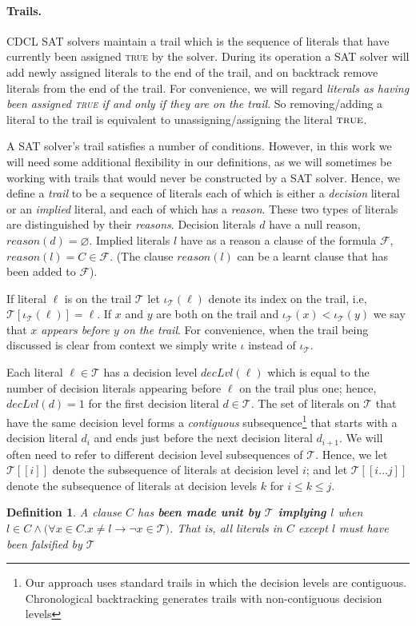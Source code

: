 \documentclass[runningheads]{llncs}
\newcommand{\sat}{SAT\xspace}
\newcommand{\trail}{\ensuremath{\mathcal{T}}}
\newcommand{\trailIdxT}[2]{\ensuremath{\iota_{#1}(#2)}}
\newcommand{\range}[2]{#1\ldots#2}
\newcommand{\dlevel}[1]{\ensuremath{\mathit{decLvl}(#1)}}
\newcommand{\true}{\textsc{true}\xspace}
\newcommand{\reason}[1]{\ensuremath{\mathit{reason}(#1)}}
\newcommand{\formula}{\ensuremath{\mathcal{F}}}
\renewcommand{\implies}{\rightarrow}
\newtheorem{defn}{Definition}
\begin{document}
\paragraph{Trails.}
CDCL \sat solvers maintain a trail which is the sequence of literals
that have currently been assigned \true by the solver. During its
operation a \sat solver will add newly assigned literals to the end of
the trail, and on backtrack remove literals from the end of the
trail. For convenience, we will regard \emph{literals as having been
  assigned \true if and only if they are on the trail}. So
removing/adding a literal to the trail is equivalent to
unassigning/assigning the literal $\true$.

A \sat solver's trail satisfies a number of conditions. However, in
this work we will need some additional flexibility in our definitions,
as we will sometimes be working with trails that would never be
constructed by a \sat solver. Hence, we define a \emph{trail} to be a
sequence of literals each of which is either a \emph{decision} literal
or an \emph{implied} literal, and each of which has a
\emph{reason}. These two types of literals are distinguished by their
\emph{reasons}. Decision literals $d$ have a null reason,
$\reason{d} = \varnothing$. Implied literals $l$ have as a reason a
clause of the formula $\formula$, $\reason{l} =
C\in\formula$. (The clause $\reason{l}$ can be a learnt clause that has been
added to $\formula$).

If literal $\ell$ is on the trail $\trail$ let
$\trailIdxT{\trail}{\ell}$ denote its index on the trail, i.e,
$\trail[\trailIdxT{\trail}{\ell}] = \ell$. If $x$ and $y$ are both on
the trail and $\trailIdxT{\trail}{x} < \trailIdxT{\trail}{y}$ we say
that \textit{$x$ appears before $y$ on the trail}. For convenience,
when the trail being discussed is clear from context we simply write
$\iota$ instead of $\iota_{\trail}$.

Each literal $\ell\in\trail$ has a decision level $\dlevel{\ell}$
which is equal to the number of decision literals appearing before
$\ell$ on the trail plus one; hence, $\dlevel{d}=1$ for the first
decision literal $d\in\trail$. The set of literals on $\trail$ that
have the same decision level forms a \emph{contiguous}
subsequence\footnote{Our approach uses standard trails in which the
  decision levels are contiguous. Chronological backtracking
  \cite{DBLP:conf/lpar/JiangZ13,DBLP:conf/sat/NadelR18,DBLP:conf/sat/MohleB19}
  generates trails with non-contiguous decision levels} that starts
with a decision literal $d_i$ and ends just before the next decision
literal $d_{i+1}$. We will often need to refer to different decision
level subsequences of $\trail$. Hence, we let $\trail[[i]]$ denote the
subsequence of literals at decision level $i$; and let
$\trail[[\range{i}{j}]]$ denote the subsequence of literals at
decision levels $k$ for $i\leq k\leq j$. 
\begin{defn}
    A clause $C$ has \textbf{been made unit by $\trail$ implying $l$}
    when
    $l\in C \land \bigl(\forall x\in C. x\neq l \implies \lnot x \in
    \trail\bigr)$. That is, all literals in $C$ except $l$ must have
    been falsified by $\trail$
\end{defn}
\end{document}
